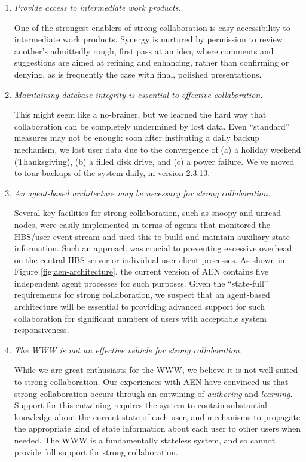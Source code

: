\begin{enumerate}
\item {\em Provide access to intermediate work products.}

  One of the strongest enablers of strong collaboration is easy
  accessibility to intermediate work products.  Synergy is nurtured
  by permission to review another's admittedly rough, first pass at an idea,
  where comments and suggestions are aimed at refining and enhancing,
  rather than confirming or denying, as is frequently the case with final,
  polished presentations.


\item {\em Maintaining database integrity is essential to effective
  collaboration.}

  This might seem like a no-brainer, but we learned the hard way that
  collaboration can be completely undermined by lost data.  Even
  ``standard'' measures may not be enough: soon after instituting a daily
  backup mechanism, we lost user data due to the convergence of (a) a
  holiday weekend (Thanksgiving), (b) a filled disk drive, and (c) a
  power failure.  We've moved to four backups of the system daily, in
  version 2.3.13.


\item {\em An agent-based architecture may be necessary for strong
  collaboration.}

  Several key facilities for strong collaboration, such as snoopy and
  unread nodes, were easily implemented in terms of agents that monitored
  the HBS/user event stream and used this to build and maintain auxiliary
  state information.  Such an approach was crucial to preventing
  excessive overhead on the central HBS server or individual user client
  processes.  As shown in Figure \ref{fig:aen-architecture}, the current
  version of AEN contains five independent agent processes for such
  purposes. Given the ``state-full'' requirements for strong
  collaboration, we suspect that an agent-based architecture will be
  essential to providing advanced support for such collaboration for
  significant numbers of users with acceptable system responsiveness.


\item {\em The WWW is not an effective vehicle for strong collaboration.}

  While we are great enthusiasts for the WWW, we believe it is not
  well-suited to strong collaboration.  Our experiences with AEN have
  convinced us that strong collaboration occurs through an entwining of
  {\em authoring} and {\em learning}. Support for this entwining requires
  the system to contain substantial knowledge about the current state of
  each user, and mechanisms to propagate the appropriate kind of state
  information about each user to other users when needed.  The WWW is a
  fundamentally stateless system, and so cannot provide full support for
  strong collaboration.

\end{enumerate}






